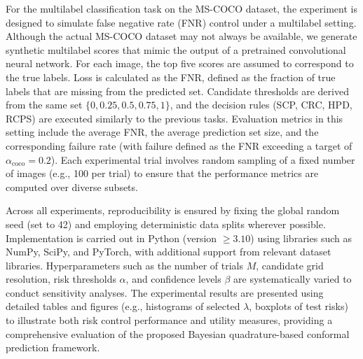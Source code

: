 \documentclass{article}
\begin{document}
For the multilabel classification task on the MS-COCO dataset, the experiment is designed to simulate false negative rate (FNR) control under a multilabel setting. Although the actual MS-COCO dataset may not always be available, we generate synthetic multilabel scores that mimic the output of a pretrained convolutional neural network. For each image, the top five scores are assumed to correspond to the true labels. Loss is calculated as the FNR, defined as the fraction of true labels that are missing from the predicted set. Candidate thresholds are derived from the same set \(\{0, 0.25, 0.5, 0.75, 1\}\), and the decision rules (SCP, CRC, HPD, RCPS) are executed similarly to the previous tasks. Evaluation metrics in this setting include the average FNR, the average prediction set size, and the corresponding failure rate (with failure defined as the FNR exceeding a target of \(\alpha_{\text{coco}} = 0.2\)). Each experimental trial involves random sampling of a fixed number of images (e.g., 100 per trial) to ensure that the performance metrics are computed over diverse subsets. 

Across all experiments, reproducibility is ensured by fixing the global random seed (set to 42) and employing deterministic data splits wherever possible. Implementation is carried out in Python (version \(\geq 3.10\)) using libraries such as NumPy, SciPy, and PyTorch, with additional support from relevant dataset libraries. Hyperparameters such as the number of trials \(M\), candidate grid resolution, risk thresholds \(\alpha\), and confidence levels \(\beta\) are systematically varied to conduct sensitivity analyses. The experimental results are presented using detailed tables and figures (e.g., histograms of selected \(\lambda\), boxplots of test risks) to illustrate both risk control performance and utility measures, providing a comprehensive evaluation of the proposed Bayesian quadrature-based conformal prediction framework.
\end{document}
